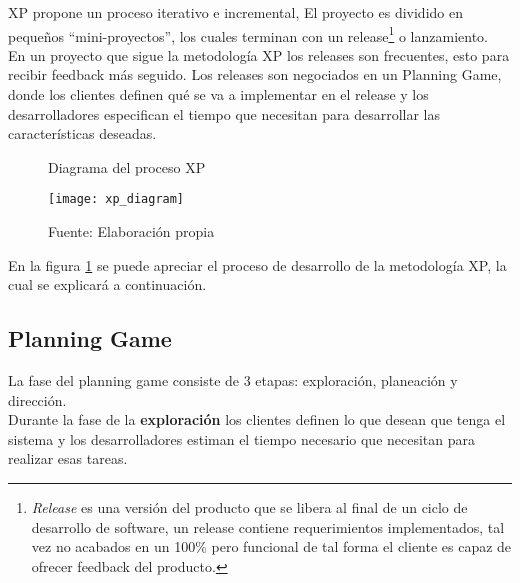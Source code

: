 
        XP propone un proceso iterativo e incremental, El proyecto es dividido en pequeños “mini-proyectos”, los cuales terminan con un release\footnote{\emph{Release} es una versión del producto que se libera al final de un ciclo de desarrollo de software, un release contiene requerimientos implementados, tal vez no acabados en un  100\% pero funcional de tal forma el cliente es capaz de ofrecer feedback del producto.} o lanzamiento.\\

      En un proyecto que sigue la metodología XP los releases son frecuentes, esto para recibir feedback más seguido. Los releases son negociados en un Planning Game, donde los clientes definen qué se va a implementar en el release y los desarrolladores especifican el tiempo que necesitan para desarrollar las características deseadas.\\

      \begin{figure}[H]
        \caption{Diagrama del proceso XP}
        \label{fig:xp_diagram}
        \begin{center}
          \texttt{[image: xp\_diagram]}
        \end{center}
        \caption*{Fuente: Elaboración propia}
      \end{figure}

      En la figura \ref{fig:xp_diagram} se puede apreciar el proceso de desarrollo de la metodología XP, la cual se explicará a continuación.\\

        \subsection{Planning Game}
        \label{sub:planning_game}

        La fase del planning game consiste de 3 etapas: exploración, planeaci\'on y direcci\'on.\\

        Durante la fase de la \textbf{exploración} los clientes definen lo que desean que tenga el sistema y los desarrolladores estiman el tiempo necesario que necesitan para realizar esas tareas.\\

